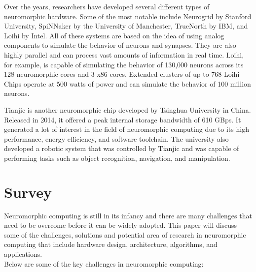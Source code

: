\documentclass[screen, acmtog]{acmart}
\begin{document}
Over the years, researchers have developed several different types of neuromorphic hardware. Some of the most notable include Neurogrid by Stanford University, SpiNNaker by the University of Manchester, TrueNorth by IBM, and Loihi by Intel. All of these systems are based on the idea of using analog components to simulate the behavior of neurons and synapses. They are also highly parallel and can process vast amounts of information in real time. Loihi, for example, is capable of simulating the behavior of 130,000 neurons across its 128 neuromorphic cores and 3 x86 cores. Extended clusters of up to 768 Loihi Chips operate at 500 watts of power and can simulate the behavior of 100 million neurons.

Tianjic is another neuromorphic chip developed by Tsinghua University in China. Released in 2014, it offered a peak internal storage bandwidth of 610 GBps. It generated a lot of interest in the field of neuromorphic computing due to its high performance, energy efficiency, and software toolchain. The university also developed a robotic system that was controlled by Tianjic and was capable of performing tasks such as object recognition, navigation, and manipulation.
\section{Survey}

Neuromorphic computing is still in its infancy and there are many challenges that need to be overcome before it can be widely adopted. This paper will discuss some of the challenges, solutions and potential area of research in neuromorphic computing that include hardware design, architecture, algorithms, and applications. \\
Below are some of the key challenges in neuromorphic computing:
\end{document}
